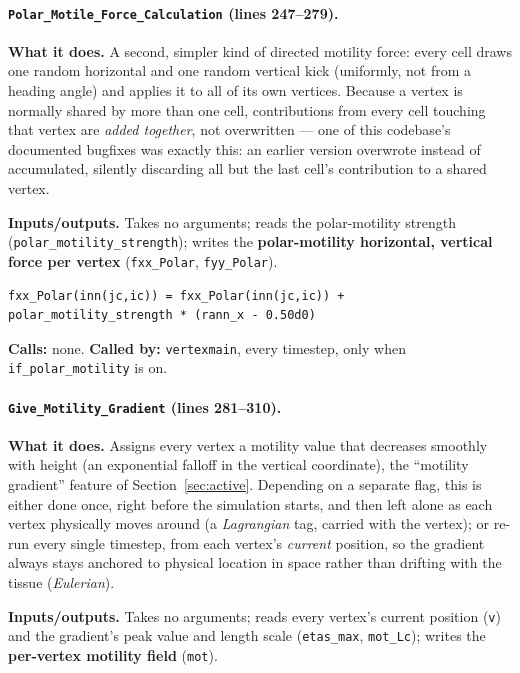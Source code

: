 \documentclass[11pt]{article}
\begin{document}
\paragraph{\texttt{Polar\_Motile\_Force\_Calculation} (lines 247--279).}
\textbf{What it does.} A second, simpler kind of directed motility force: every cell
draws one random horizontal and one random vertical kick (uniformly, not from a
heading angle) and applies it to all of its own vertices. Because a vertex is normally
shared by more than one cell, contributions from every cell touching that vertex are
\emph{added together}, not overwritten --- one of this codebase's documented bugfixes
was exactly this: an earlier version overwrote instead of accumulated, silently
discarding all but the last cell's contribution to a shared vertex.

\textbf{Inputs/outputs.} Takes no arguments; reads the polar-motility strength
(\texttt{polar\_motility\_strength}); writes the \textbf{polar-motility horizontal,
vertical force per vertex} (\texttt{fxx\_Polar}, \texttt{fyy\_Polar}).

\begin{lstlisting}[caption={Accumulating (not overwriting) each cell's contribution to a shared vertex, in \texttt{Polar\_Motile\_Force\_Calculation}.}]
fxx_Polar(inn(jc,ic)) = fxx_Polar(inn(jc,ic)) + polar_motility_strength * (rann_x - 0.50d0)
\end{lstlisting}

\textbf{Calls:} none. \textbf{Called by:} \texttt{vertexmain}, every timestep, only
when \texttt{if\_polar\_motility} is on.

\paragraph{\texttt{Give\_Motility\_Gradient} (lines 281--310).}
\textbf{What it does.} Assigns every vertex a motility value that decreases smoothly
with height (an exponential falloff in the vertical coordinate), the ``motility
gradient'' feature of Section~\ref{sec:active}. Depending on a separate flag, this is
either done once, right before the simulation starts, and then left alone as each
vertex physically moves around (a \emph{Lagrangian} tag, carried with the vertex); or
re-run every single timestep, from each vertex's \emph{current} position, so the
gradient always stays anchored to physical location in space rather than drifting with
the tissue (\emph{Eulerian}).

\textbf{Inputs/outputs.} Takes no arguments; reads every vertex's current position
(\texttt{v}) and the gradient's peak value and length scale (\texttt{etas\_max},
\texttt{mot\_Lc}); writes the \textbf{per-vertex motility field} (\texttt{mot}).
\end{document}
